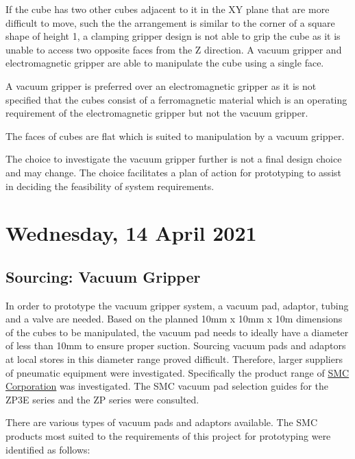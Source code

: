 \begin{compactitem}
    \item If the cube has two other cubes adjacent to it in the XY plane that are more difficult to move, such the the arrangement is similar to the corner of a square shape of height 1, a clamping gripper design is not able to grip the cube as it is unable to access two opposite faces from the Z direction. A vacuum gripper and electromagnetic gripper are able to manipulate the cube using a single face.
    \item A vacuum gripper is preferred over an electromagnetic gripper as it is not specified that the cubes consist of a ferromagnetic material which is an operating requirement of the electromagnetic gripper but not the vacuum gripper.
    \item The faces of cubes are flat which is suited to manipulation by a vacuum gripper.
\end{compactitem}

The choice to investigate the vacuum gripper further is not a final design choice and may change. The choice facilitates a plan of action for prototyping to assist in deciding the feasibility of system requirements.

\pendsign

\section[2021/04/14]{Wednesday, 14 April 2021}

\subsection{Sourcing: Vacuum Gripper}

In order to prototype the vacuum gripper system, a vacuum pad, adaptor, tubing and a valve are needed. Based on the planned 10mm x 10mm x 10m dimensions of the cubes to be manipulated, the vacuum pad needs to ideally have a diameter of less than 10mm to ensure proper suction. Sourcing vacuum pads and adaptors at local stores in this diameter range proved difficult. Therefore, larger suppliers of pneumatic equipment were investigated. Specifically the product range of \href{https://www.smcworld.com/corporate/network/south_africa.html}{SMC Corporation} was investigated. The SMC vacuum pad selection guides for the ZP3E series \cite{smc_zp3e_vacuum_pads} and the ZP series \cite{smc_basic_zp_pads} were consulted.

There are various types of vacuum pads and adaptors available. The SMC products most suited to the requirements of this project for prototyping were identified as follows:


